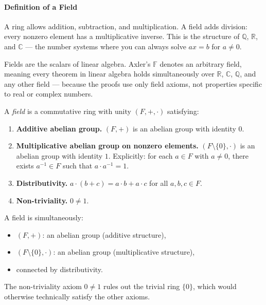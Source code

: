 \paragraph{Definition of a Field}

\begin{remark}[Motivation]
A ring allows addition, subtraction, and multiplication.
A field adds division: every nonzero element has a multiplicative inverse.
This is the structure of $\mathbb{Q}$, $\mathbb{R}$, and $\mathbb{C}$ ---
the number systems where you can always solve $ax = b$ for $a \neq 0$.

Fields are the scalars of linear algebra. Axler's $\mathbb{F}$ denotes
an arbitrary field, meaning every theorem in linear algebra holds
simultaneously over $\mathbb{R}$, $\mathbb{C}$, $\mathbb{Q}$,
and any other field --- because the proofs use only field axioms,
not properties specific to real or complex numbers.
\end{remark}

\begin{definition}[Field]
\label{def:notes-fields-definition-l19}
A \emph{field} is a commutative ring with unity $(F, +, \cdot)$
satisfying:

\begin{enumerate}[label=\textbf{F\arabic*.}]
  \item \textbf{Additive abelian group.}
        $(F, +)$ is an abelian group with identity $0$.

  \item \textbf{Multiplicative abelian group on nonzero elements.}
        $(F \setminus \{0\}, \cdot)$ is an abelian group with identity $1$.
        Explicitly: for each $a \in F$ with $a \neq 0$, there exists
        $a^{-1} \in F$ such that $a \cdot a^{-1} = 1$.

  \item \textbf{Distributivity.}
        $a \cdot (b + c) = a \cdot b + a \cdot c$
        for all $a, b, c \in F$.

  \item \textbf{Non-triviality.}
        $0 \neq 1$.
\end{enumerate}
\end{definition}

\begin{remark}
A field is simultaneously:
\begin{itemize}
  \item $(F, +)$: an abelian group (additive structure),
  \item $(F \setminus \{0\}, \cdot)$: an abelian group (multiplicative structure),
  \item connected by distributivity.
\end{itemize}
The non-triviality axiom $0 \neq 1$ rules out the trivial ring $\{0\}$,
which would otherwise technically satisfy the other axioms.
\end{remark}

